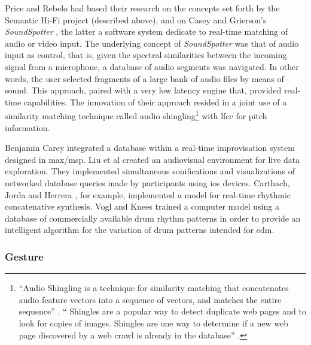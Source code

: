Price and Rebelo had based their research on the concepts set forth by the Semantic Hi-Fi project (described above), and on Casey and Grierson's \textit{SoundSpotter} \parencite{DBLP:conf/icmc/CaseyG07}, the latter a software system dedicate to real-time matching of audio or video input. The underlying concept of \textit{SoundSpotter} was that of audio input as control, that is, given the spectral similarities between the incoming signal from a microphone, a database of audio segments was navigated. In other words, the user selected fragments of a large bank of audio files by means of sound. This approach, paired with a very low latency engine that, provided real-time capabilities. The innovation of their approach resided in a joint use of a similarity matching technique called audio shingling\footnote{``Audio Shingling is a technique for similarity matching that concatenates audio feature vectors into a sequence of vectors, and matches the entire sequence'' \parencite{DBLP:conf/icmc/CaseyG07}. `` Shingles are a popular way to detect duplicate web pages and to look for copies of images. Shingles are one way to determine if a new web page discovered by a web crawl is already in the database'' \parencite{DBLP:conf/ismir/CaseyS06}.} with \gls{lfcc} for pitch information.

Benjamin Carey \parencite{Carey:2012} integrated a database within a real-time improvisation system designed in \gls{max/msp}. Liu et al \parencite{Liu:2013} created an audiovisual environment for live data exploration. They implemented simultaneous sonifications and visualizations of networked database queries made by participants using \gls{ios} devices. Carthach, Jorda and Herrera \parencite{Nuannicode225in2016}, for example, implemented a model for real-time rhythmic concatenative synthesis. Vogl and Knees \parencite{rvogl:2017} trained a computer model using a database of commercially available drum rhythm patterns in order to provide an intelligent algorithm for the variation of drum patterns intended for \gls{edm}.


\subsubsection{Gesture}
\label{application:gesture}

